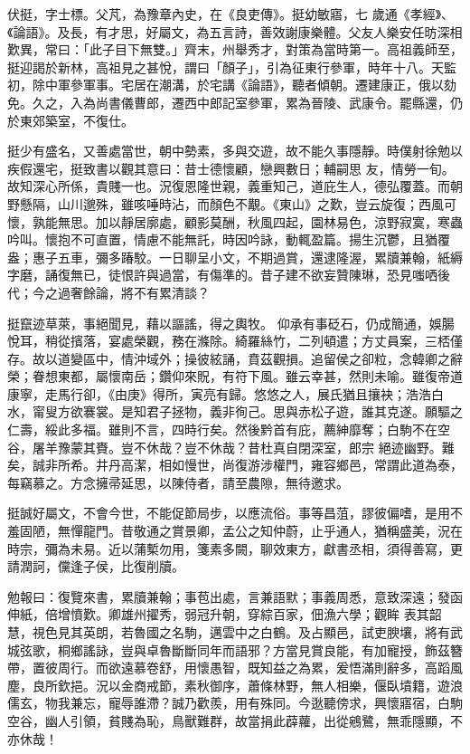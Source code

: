 \begin{pinyinscope}
 伏挺，字士標。父芃，為豫章內史，在《良吏傳》。挺幼敏寤，七
 歲通《孝經》、《論語》。及長，有才思，好屬文，為五言詩，善效謝康樂體。父友人樂安任昉深相歎異，常曰：「此子目下無雙。」齊末，州舉秀才，對策為當時第一。高祖義師至，挺迎謁於新林，高祖見之甚悅，謂曰「顏子」，引為征東行參軍，時年十八。天監初，除中軍參軍事。宅居在潮溝，於宅講《論語》，聽者傾朝。遷建康正，俄以劾免。久之，入為尚書儀曹郎，遷西中郎記室參軍，累為晉陵、武康令。罷縣還，仍於東郊築室，不復仕。



 挺少有盛名，又善處當世，朝中勢素，多與交遊，故不能久事隱靜。時僕射徐勉以疾假還宅，挺致書以觀其意曰：昔士德懷顧，戀興數日；輔嗣思
 友，情勞一旬。故知深心所係，貴賤一也。況復恩隆世親，義重知己，道庇生人，德弘覆蓋。而朝野懸隔，山川邈殊，雖咳唾時沾，而顏色不覯。《東山》之歎，豈云旋復；西風可懷，孰能無思。加以靜居廓處，顧影莫酬，秋風四起，園林易色，涼野寂寞，寒蟲吟叫。懷抱不可直置，情慮不能無託，時因吟詠，動輒盈篇。揚生沉鬱，且猶覆盎；惠子五車，彌多踳駮。一日聊呈小文，不期過賞，還逮隆渥，累牘兼翰，紙縟字磨，誦復無已，徒恨許與過當，有傷準的。昔子建不欲妄贊陳琳，恐見嗤哂後代；今之過奢餘論，將不有累清談？



 挺竄迹草萊，事絕聞見，藉以謳謠，得之輿牧。
 仰承有事砭石，仍成簡通，娛腸悅耳，稍從擯落，宴處榮觀，務在滌除。綺羅絲竹，二列頓遣；方丈員案，三桮僅存。故以道變區中，情沖域外；操彼絃誦，賁茲觀損。追留侯之卻粒，念韓卿之辭榮；眷想東都，屬懷南岳；鑽仰來貺，有符下風。雖云幸甚，然則未喻。雖復帝道康寧，走馬行卻，《由庚》得所，寅亮有歸。悠悠之人，展氏猶且攘袂；浩浩白水，甯叟方欲褰裳。是知君子拯物，義非徇己。思與赤松子遊，誰其克遂。願驅之仁壽，綏此多福。雖則不言，四時行矣。然後黔首有庇，薦紳靡奪；白駒不在空谷，屠羊豫蒙其賚。豈不休哉？豈不休哉？昔杜真自閉深室，郎宗
 絕迹幽野。難矣，誠非所希。井丹高潔，相如慢世，尚復游涉權門，雍容鄉邑，常謂此道為泰，每竊慕之。方念擁帚延思，以陳侍者，請至農隙，無待邀求。



 挺誠好屬文，不會今世，不能促節局步，以應流俗。事等昌菹，謬彼偏嗜，是用不羞固陋，無憚龍門。昔敬通之賞景卿，孟公之知仲蔚，止乎通人，猶稱盛美，況在時宗，彌為未易。近以蒲槧勿用，箋素多闕，聊效東方，獻書丞相，須得善寫，更請潤訶，儻逢子侯，比復削牘。



 勉報曰：復覽來書，累牘兼翰；事苞出處，言兼語默；事義周悉，意致深遠；發函伸紙，倍增憤歎。卿雄州擢秀，弱冠升朝，穿綜百家，佃漁六學；觀眸
 表其韶慧，視色見其英朗，若魯國之名駒，邁雲中之白鶴。及占顯邑，試吏腴壤，將有武城弦歌，桐鄉謠詠，豈與卓魯斷斷同年而語邪？方當見賞良能，有加寵授，飾茲簪帶，置彼周行。而欲遠慕卷舒，用懷愚智，既知益之為累，爰悟滿則辭多，高蹈風塵，良所欽挹。況以金商戒節，素秋御序，蕭條林野，無人相樂，偃臥墳籍，遊浪儒玄，物我兼忘，寵辱誰滯？誠乃歡羨，用有殊同。今逖聽傍求，興懷寤宿，白駒空谷，幽人引領，貧賤為恥，鳥獸難群，故當捐此薜蘿，出從鵷鷺，無乖隱顯，不亦休哉！




\end{pinyinscope}
